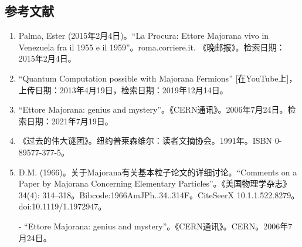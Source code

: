 \subsection{参考文献}
\begin{enumerate}
\item Palma, Ester (2015年2月4日)。“La Procura: Ettore Majorana vivo in Venezuela fra il 1955 e il 1959”。roma.corriere.it. 《晚邮报》。检索日期：2015年2月4日。

\item “Quantum Computation possible with Majorana Fermions” [在YouTube上]，上传日期：2013年4月19日，检索日期：2019年12月14日。

\item “Ettore Majorana: genius and mystery”。《CERN通讯》。2006年7月24日。检索日期：2021年7月19日。

\item 《过去的伟大谜团》。纽约普莱森维尔：读者文摘协会。1991年。ISBN 0-89577-377-5。

\item D.M. (1966)。关于Majorana有关基本粒子论文的详细讨论。“Comments on a Paper by Majorana Concerning Elementary Particles”。《美国物理学杂志》34(4): 314–318。Bibcode:1966AmJPh..34..314F。CiteSeerX 10.1.1.522.8279。doi:10.1119/1.1972947。

- “Ettore Majorana: genius and mystery”。《CERN通讯》。CERN。2006年7月24日。
\end{enumerate}